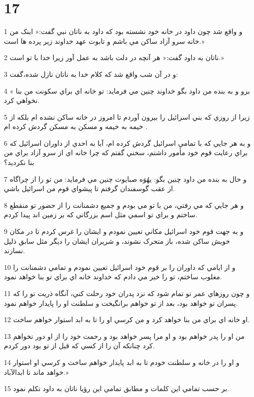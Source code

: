 \chapter{17}

\par 1 و واقع شد چون داود در خانه خود نشسته بود که داود به ناتان نبي گفت:« اينک من خانه سرو آزاد ساکن مي باشم و تابوت عهد خداوند زير پرده ها است.»
\par 2 ناتان به داود گفت:« هر آنچه در دلت باشد به عمل آور زيرا خدا با تو است.»
\par 3 و در آن شب واقع شد که کلام خدا به ناتان نازل شده،گفت:
\par 4 « برو و به بنده من داود بگو خداوند چنين مي فرمايد: تو خانه اي براي سکونت من بنا نخواهي کرد.
\par 5 زيرا از روزي که بني اسرائيل را بيرون آوردم تا امروز در خانه ساکن نشده ام بلکه از خيمه به خيمه و مسکن به مسکن گردش کرده ام .
\par 6 و به هر جايي که با تمامي اسرائيل گردش کرده ام، آيا به احدي از داوران اسرائيل که براي رعايت قوم خود مأمور داشتم، سخني گفتم که چرا خانه اي از سرو آزاد براي من بنا نکرديد؟
\par 7 و حال به بنده من داود چنين بگو: يهُوَه صبايوت چنين مي فرمايد: من تو را از چراگاه از عقب گوسفندان گرفتم تا پيشواي قوم من اسرائيل باشي.
\par 8 و هر جايي که مي رفتي، من با تو مي بودم و جميع دشمنانت را از حضور تو منقطع ساختم و براي تو اسمي مثل اسم بزرگاني که بر زمين اند پيدا کردم.
\par 9 و به جهت قوم خود اسرائيل مکاني تعيين نمودم و ايشان را غرس کردم تا در مکان خويش ساکن شده، باز متحرک نشوند، و شريران ايشان را ديگر مثل سابق ذليل نسازند.
\par 10 و از ايامي که داوران را بر قوم خود اسرائيل تعيين نمودم و تمامي دشمنانت را مغلوب ساختم، تو را خبر مي دادم که خداوند خانه اي براي تو بنا خواهد نمود.
\par 11 و چون روزهاي عمر تو تمام شود که نزد پدران خود رحلت کني، آنگاه ذريت تو را که پسران تو خواهد بود، بعد از تو خواهم برانگيخت و سلطنت او را پايدار خواهم نمود.
\par 12 او خانه اي براي من بنا خواهد کرد و من کرسي او را تا به ابد استوار خواهم ساخت.
\par 13 من او را پدر خواهم بود و او مرا پسر خواهد بود و رحمت خود را از او دور نخواهم کرد چنانکه آن را از کسي که قبل از تو بود دور کردم.
\par 14 و او را در خانه و سلطنت خودم تا به ابد پايدار خواهم ساخت و کرسي او استوار خواهد ماند تا ابدالآباد.»
\par 15 بر حسب تمامي اين کلمات و مطابق تمامي اين رؤيا ناتان به داود تکلم نمود.
